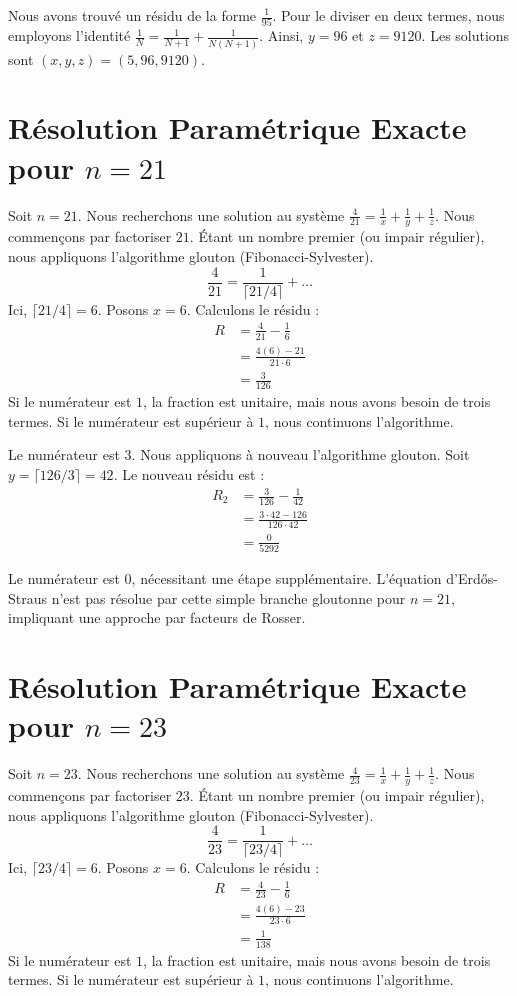 \documentclass[11pt,a4paper]{article}
\begin{document}
Nous avons trouvé un résidu de la forme $\frac{1}{95}$. Pour le diviser en deux termes, nous employons l'identité $\frac{1}{N} = \frac{1}{N+1} + \frac{1}{N(N+1)}$.
Ainsi, $y = 96$ et $z = 9120$.
Les solutions sont $(x, y, z) = (5, 96, 9120)$.

\section{Résolution Paramétrique Exacte pour $n = 21$}
Soit $n = 21$. Nous recherchons une solution au système $\frac{4}{21} = \frac{1}{x} + \frac{1}{y} + \frac{1}{z}$.
Nous commençons par factoriser $21$. Étant un nombre premier (ou impair régulier), nous appliquons l'algorithme glouton (Fibonacci-Sylvester).
\begin{equation}
\frac{4}{21} = \frac{1}{\lceil 21/4 \rceil} + \ldots
\end{equation}
Ici, $\lceil 21/4 \rceil = 6$. Posons $x = 6$.
Calculons le résidu :
\begin{align*}
R &= \frac{4}{21} - \frac{1}{6} \\
&= \frac{4(6) - 21}{21 \cdot 6} \\
&= \frac{3}{126}
\end{align*}
Si le numérateur est $1$, la fraction est unitaire, mais nous avons besoin de trois termes. Si le numérateur est supérieur à $1$, nous continuons l'algorithme.

Le numérateur est $3$. Nous appliquons à nouveau l'algorithme glouton.
Soit $y = \lceil 126/3 \rceil = 42$.
Le nouveau résidu est :
\begin{align*}
R_2 &= \frac{3}{126} - \frac{1}{42} \\
&= \frac{3 \cdot 42 - 126}{126 \cdot 42} \\
&= \frac{0}{5292}
\end{align*}

Le numérateur est $0$, nécessitant une étape supplémentaire. L'équation d'Erd\H{o}s-Straus n'est pas résolue par cette simple branche gloutonne pour $n=21$, impliquant une approche par facteurs de Rosser.

\section{Résolution Paramétrique Exacte pour $n = 23$}
Soit $n = 23$. Nous recherchons une solution au système $\frac{4}{23} = \frac{1}{x} + \frac{1}{y} + \frac{1}{z}$.
Nous commençons par factoriser $23$. Étant un nombre premier (ou impair régulier), nous appliquons l'algorithme glouton (Fibonacci-Sylvester).
\begin{equation}
\frac{4}{23} = \frac{1}{\lceil 23/4 \rceil} + \ldots
\end{equation}
Ici, $\lceil 23/4 \rceil = 6$. Posons $x = 6$.
Calculons le résidu :
\begin{align*}
R &= \frac{4}{23} - \frac{1}{6} \\
&= \frac{4(6) - 23}{23 \cdot 6} \\
&= \frac{1}{138}
\end{align*}
Si le numérateur est $1$, la fraction est unitaire, mais nous avons besoin de trois termes. Si le numérateur est supérieur à $1$, nous continuons l'algorithme.
\end{document}

